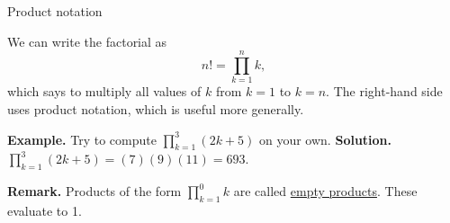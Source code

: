 \documentclass[10pt]{beamer}
\begin{document}
\begin{frame}{Product notation}

We can write the factorial as 
\[ n! = \prod_{k=1}^n k,\]
which says to multiply all values of $k$ from $k=1$ to $k=n$.
\pause  
\vfill 
The right-hand side uses \alert{product notation}, which is useful more generally.
\pause 
\vfill 

\colorbox{yellow!30}{\textbf{Example.}} Try to compute $\prod_{k=1}^3 (2k+5)$ on your own.
\pause 
\vfill 
\colorbox{green!30}{\textbf{Solution.}} $\prod_{k=1}^3 (2k+5) = (7)(9)(11) =693.$

\pause 
\vfill 
\colorbox{red!30}{\textbf{Remark.}} Products of the form $\prod_{k=1}^0 k$ are called \underline{empty products}. These evaluate to 1. 

\end{frame}
\end{document}
